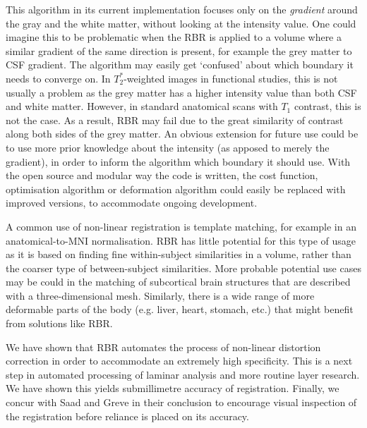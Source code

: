This algorithm in its current implementation focuses only on the \emph{gradient} around the gray and the white matter, without looking at the intensity value. One could imagine this to be problematic when the RBR is applied to a volume where a similar gradient of the same direction is present, for example the grey matter to CSF gradient. The algorithm may easily get `confused' about which boundary it needs to converge on. In $T_2^*$-weighted images in functional studies, this is not usually a problem as the grey matter has a higher intensity value than both CSF and white matter. However, in standard anatomical scans with $T_1$ contrast, this is not the case. As a result, RBR may fail due to the great similarity of contrast along both sides of the grey matter. An obvious extension for future use could be to use more prior knowledge about the intensity (as apposed to merely the gradient), in order to inform the algorithm which boundary it should use. With the open source and modular way the code is written, the cost function, optimisation algorithm or deformation algorithm could easily be replaced with improved versions, to accommodate ongoing development. 

A common use of non-linear registration is template matching, for example in an anatomical-to-MNI normalisation. RBR has little potential for this type of usage as it is based on finding fine within-subject similarities in a volume, rather than the coarser type of between-subject similarities. More probable potential use cases may be could in the matching of subcortical brain structures that are described with a three-dimensional mesh. Similarly, there is a wide range of more deformable parts of the body (e.g. liver, heart, stomach, etc.) that might benefit from solutions like RBR. 

We have shown that RBR automates the process of non-linear distortion correction in order to accommodate an extremely high specificity. This is a next step in automated processing of laminar analysis and more routine layer research. We have shown this yields submillimetre accuracy of registration. Finally, we concur with Saad \citep{Saad2009} and Greve \citep{Greve2009} in their conclusion to encourage visual inspection of the registration before reliance is placed on its accuracy.







